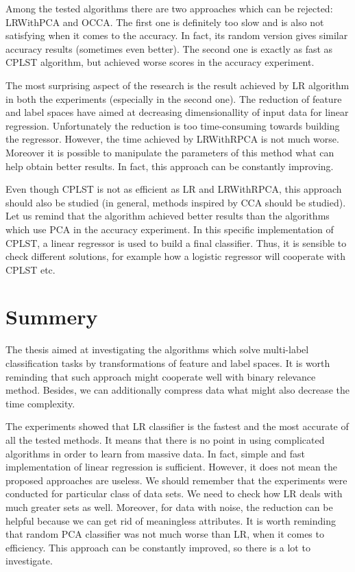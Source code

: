 Among the tested algorithms there are two approaches which can be rejected: LRWithPCA and OCCA. The first one is definitely too slow and is also not satisfying when it comes to the accuracy. In fact, its random version gives similar accuracy results (sometimes even better). The second one is exactly as fast as CPLST algorithm, but achieved worse scores in the accuracy experiment. 

The most surprising aspect of the research is the result achieved by LR algorithm in both the experiments (especially in the second one). The reduction of feature and label spaces have aimed at decreasing dimensionallity of input data for linear regression. Unfortunately the reduction is too time-consuming towards building the regressor. However, the time achieved by LRWithRPCA is not much worse. Moreover it is possible to manipulate the parameters of this method what can help obtain better results. In fact, this approach can be constantly improving.   

Even though CPLST is not as efficient as LR and LRWithRPCA, this approach should also be studied (in general, methods inspired by CCA should be studied). Let us remind that the algorithm achieved better results than the algorithms which use PCA in the accuracy experiment. In this specific implementation of CPLST, a linear regressor is used to build a final classifier. Thus, it is sensible to check different solutions, for example how a logistic regressor will cooperate with CPLST etc.

\section{Summery}

The thesis aimed at investigating the algorithms which solve multi-label classification tasks by transformations of feature and label spaces. It is worth reminding that such approach might cooperate well with binary relevance method. Besides, we can additionally compress data what might also decrease the time complexity. 

The experiments showed that LR classifier is the fastest and the most accurate of all the tested methods. It means that there is no point in using complicated algorithms in order to learn from massive data. In fact, simple and fast implementation of linear regression is sufficient. However, it does not mean the proposed approaches are useless. We should remember that the experiments were conducted for particular class of data sets. We need to check how LR deals with much greater sets as well. Moreover, for data with noise, the reduction can be helpful because we can get rid of meaningless attributes. It is worth reminding that random PCA classifier was not much worse than LR, when it comes to efficiency. This approach can be constantly improved, so there is a lot to investigate.

